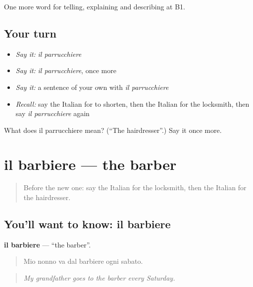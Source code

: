 \begin{grammarlens}[title={What you've built}]
One more word for telling, explaining and describing at B1.
\end{grammarlens}

\subsection*{Your turn}
\begin{itemize}
\raggedright
  \item \emph{Say it:} \emph{il parrucchiere}
  \item \emph{Say it:} \emph{il parrucchiere}, once more
  \item \emph{Say it:} a sentence of your own with \emph{il parrucchiere}
  \item \emph{Recall:} say the Italian for to shorten, then the Italian for the locksmith, then say \emph{il parrucchiere} again
\end{itemize}

\begin{tcolorbox}[breakable,colback=teal!4,colframe=teal!35!black,title={Before you move on}]
What does il parrucchiere mean? (\textquotedblleft{}The hairdresser\textquotedblright{}.) Say it once more.
\end{tcolorbox}
\section[il barbiere]{il barbiere — the barber}

\label{lesson:IT-C456-barbiere}



\begin{quote}
Before the new one: say the Italian for the locksmith, then the Italian for the hairdresser.
\end{quote}

\subsection*{You'll want to know: il barbiere}
\textbf{il barbiere} — \textquotedblleft{}the barber\textquotedblright{}.

\begin{quote}
Mio nonno va dal barbiere ogni sabato.
\end{quote}

\begin{quote}
\emph{My grandfather goes to the barber every Saturday.}
\end{quote}

